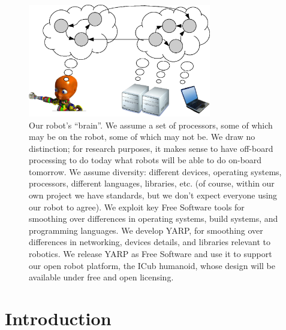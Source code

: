 

\begin{figure}
\centerline{
\includegraphics[width=8cm]{fig-nethead}
}
\caption{
%
Our robot's ``brain''.
We assume a set of processors, some of which may
be on the robot, some of which may not be. We draw no 
distinction; for research purposes, it makes sense to
have off-board processing to do today what robots will
be able to do on-board tomorrow.
%
We assume diversity:
different devices, operating systems, processors, different languages,
libraries, etc. (of course, within our own project we have standards,
but we don't expect everyone using our robot to agree).
%
%
We exploit key Free Software tools for smoothing over differences in
operating systems, build systems, and programming languages.
%
We develop YARP, for smoothing over differences in networking,
devices details, and libraries relevant to robotics.
%
%
%
%
We release YARP as Free Software
 and use it to support our open robot
platform, the ICub humanoid, whose design will be available under free
and open licensing.
%
}
\end{figure}


\section{Introduction}



